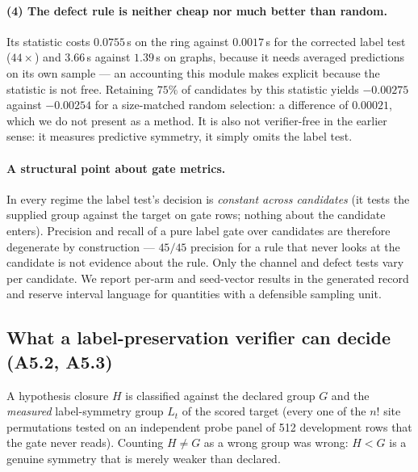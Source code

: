 \documentclass{neurips_2024}
\begin{document}
\paragraph{(4) The defect rule is neither cheap nor much better than random.} Its statistic
costs $0.0755$\,s on the ring against $0.0017$\,s for the corrected label test ($44\times$)
and $3.66$\,s against $1.39$\,s on graphs, because it needs averaged predictions on its own
sample --- an accounting this module makes explicit because the statistic is not free.
Retaining $75\%$ of candidates by this
statistic yields $-0.00275$ against $-0.00254$ for a size-matched random selection: a
difference of $0.00021$, which we do not present as a method. It is also not verifier-free in
the earlier sense: it measures predictive symmetry, it simply omits the label test.

\paragraph{A structural point about gate metrics.} In every regime the label test's decision
is \emph{constant across candidates} (it tests the supplied group against the target on gate
rows; nothing about the candidate enters). Precision and recall of a pure label gate over
candidates are therefore degenerate by construction --- $45/45$ precision for a rule that
never looks at the candidate is not evidence about the rule. Only the channel and defect tests
vary per candidate. We report per-arm and seed-vector results in the generated record and
reserve interval language for quantities with a defensible sampling unit.

\subsection{What a label-preservation verifier can decide (A5.2, A5.3)}
\label{sec:semantics}

A hypothesis closure $H$ is classified against the declared group $G$
and the \emph{measured} label-symmetry group $L_t$ of the scored target (every one of the
$n!$ site permutations tested on an independent probe panel of 512 development rows that the
gate never reads). Counting $H \ne G$ as a wrong group was wrong: $H < G$ is a genuine
symmetry that is merely weaker than declared.
\end{document}
